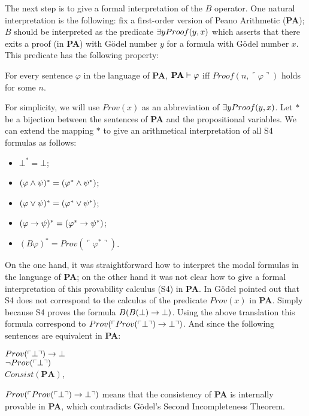 \qquad The next step is to give a formal interpretation of the $B$ operator. One natural interpretation is the following: fix a first-order version of Peano Arithmetic (\textbf{PA}); $B$ should be interpreted as the predicate $\exists y Proof (y,x)$ which asserts that there exits a proof (in \textbf{PA}) with Gödel number $y$ for a formula with Gödel number $x$. This predicate has the following property:


\begin{center}
	For every sentence $\varphi$ in the language of \textbf{PA}, $\textbf{PA} \vdash \varphi$ iff $Proof (n,\ulcorner \varphi\urcorner)$ holds for some $n$.
\end{center} 

\qquad For simplicity, we will use $Prov(x)$ as an abbreviation of $\exists y Proof (y,x)$. Let $*$ be a bijection between the sentences of \textbf{PA} and the propositional variables. We can extend the mapping $*$ to give an arithmetical interpretation of all S4 formulas as follows:

\begin{itemize}
	\item $\bot^{*} = \bot$;
	\item $(\varphi \wedge \psi)^{*} = (\varphi^{*} \wedge \psi^{*})$;
	\item $(\varphi \vee \psi)^{*} = (\varphi^{*} \vee \psi^{*})$;	
	\item $(\varphi \rightarrow \psi)^{*} = (\varphi^{*} \rightarrow \psi^{*})$;
	\item $(B\varphi)^{*} = Prov(\ulcorner \varphi^{*}\urcorner)$.
\end{itemize}

\qquad On the one hand, it was straightforward how to interpret the modal formulas in the language of \textbf{PA}; on the other hand it was not clear how to give a formal interpretation of this provability calculus (S4) in \textbf{PA}. In \cite{Goedel33} Gödel pointed out that S4 does not correspond to the calculus of the predicate $Prov(x)$ in \textbf{PA}. Simply because S4 proves the formula $B(B(\bot) \rightarrow \bot)$. Using the above translation this formula correspond to $Prov(\ulcorner Prov(\ulcorner\bot\urcorner) \rightarrow \bot\urcorner)$. And since the following sentences are equivalent in \textbf{PA}:

\begin{center}
	$Prov(\ulcorner\bot\urcorner) \rightarrow \bot$\\
	$\neg Prov(\ulcorner\bot\urcorner)$\\
	$Consist(\textbf{PA})$,
\end{center}
$Prov(\ulcorner Prov(\ulcorner\bot\urcorner) \rightarrow \bot\urcorner)$ means that the consistency of \textbf{PA} is internally provable in \textbf{PA}, which contradicts Gödel's Second Incompleteness Theorem.

